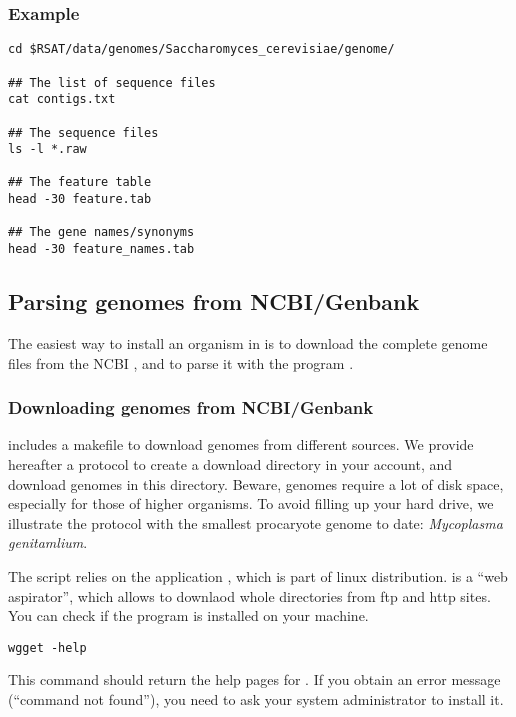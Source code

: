 \subsubsection{Example}

\begin{verbatim}
cd $RSAT/data/genomes/Saccharomyces_cerevisiae/genome/

## The list of sequence files
cat contigs.txt

## The sequence files
ls -l *.raw

## The feature table
head -30 feature.tab

## The gene names/synonyms
head -30 feature_names.tab

\end{verbatim}


\subsection{Parsing genomes from NCBI/Genbank}

The easiest way to install an organism in \RSAT is to download the
complete genome files from the NCBI
, and to parse it with the
program .

\subsubsection{Downloading genomes from NCBI/Genbank}

\RSAT includes a makefile to download genomes from different sources.
We provide hereafter a protocol to create a download directory in your
account, and download genomes in this directory. Beware, genomes
require a lot of disk space, especially for those of higher
organisms. To avoid filling up your hard drive, we illustrate the protocol
with the smallest procaryote genome to date: \textit{Mycoplasma
  genitamlium}.

The script  relies on the
application , which is part of linux
distribution.  is a ``web aspirator'', which allows to
downlaod whole directories from ftp and http sites. You can check if
the program is installed on your machine.

\begin{verbatim}
wgget -help
\end{verbatim}

This command should return the help pages for .  If you
obtain an error message (``command not found''), you need to ask your
system administrator to install it.

